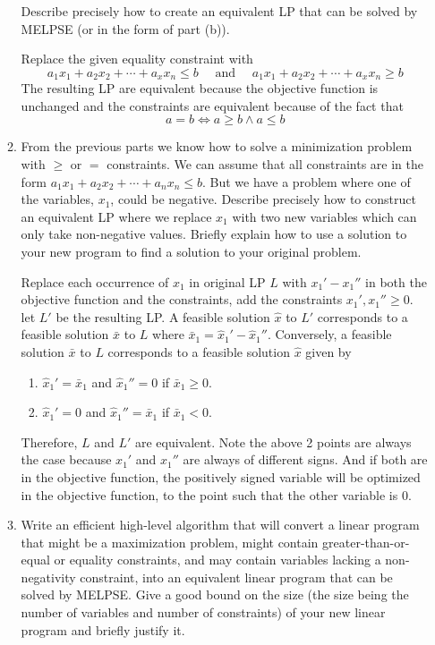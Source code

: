 \documentclass[11pt]{article}
\begin{document}
\begin{enumerate}
\begin{enumerate}
        Describe precisely how to create an equivalent LP that can be solved by MELPSE (or in the form of part (b)).
        \begin{solution}
            Replace the given equality constraint with 
            \[
                a_1 x_1 + a_2 x_2 + \cdots + a_x x_n \leq b \quad \text{ and } \quad a_1 x_1 + a_2 x_2 + \cdots + a_x x_n \geq b
            \]
            The resulting LP are equivalent because the objective function is unchanged and the constraints are equivalent because of the fact that 
            \[
                a = b \iff a \geq b \land a \leq b
            \]
        \end{solution}
        \item From the previous parts we know how to solve a minimization problem with $\geq$ or $=$
        constraints. We can assume that all constraints are in the form $a_1x_1 + a_2x_2 + \cdots + a_nx_n \leq b$. But we have a problem where one of the variables, $x_1$, could be negative. Describe precisely how to construct an equivalent LP where we replace $x_1$ with two new variables which can only take non-negative values. Briefly explain how to use a solution to your new program to find a solution to your original problem.
        \begin{solution}
            Replace each occurrence of $x_1$ in original LP $L$ with $x_1' - x_1''$ in both the objective function and the constraints, add the constraints $x_1', x_1'' \geq 0$. let $L'$ be the resulting LP. A feasible solution $\hat{x}$ to $L'$ corresponds to a feasible solution $\bar{x}$ to $L$ where $\bar{x}_1 = \hat{x}_1' - \hat{x}_1''$. Conversely, a feasible solution $\bar{x}$ to $L$ corresponds to a feasible solution $\hat{x}$ given by 
            \begin{enumerate}
                \item $\hat{x}_1' = \bar{x}_1$ and $\hat{x}_1'' = 0$ if $\bar{x}_1 \geq 0$. 
                \item $\hat{x}_1' = 0$ and $\hat{x}_1'' = \bar{x}_1$ if $\bar{x}_1 < 0$.
            \end{enumerate}
            Therefore, $L$ and $L'$ are equivalent. Note the above 2 points are always the case because $x_1'$ and $x_1''$ are always of different signs. And if both are in the objective function, the positively signed variable will be optimized in the objective function, to the point such that the other variable is 0.
        \end{solution}
        \item Write an efficient high-level algorithm that will convert a linear program that might be a maximization problem, might contain greater-than-or-equal or equality constraints, and may contain variables lacking a non-negativity constraint, into an equivalent linear program that can be solved by MELPSE. Give a good bound on the size (the size being the number of variables and number of constraints) of your new linear program and briefly justify it.

\end{enumerate}
\end{enumerate}
\end{document}
